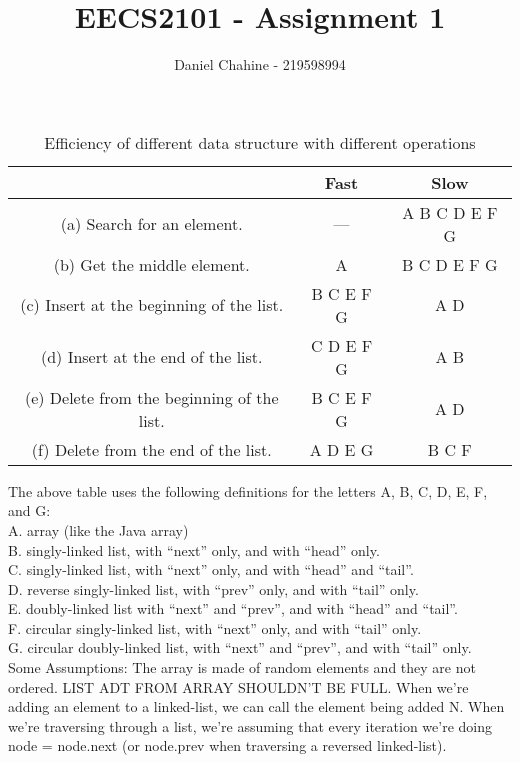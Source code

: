 \documentclass{article}
\title{EECS2101 - Assignment 1}
\author{Daniel Chahine - 219598994}
\begin{document}
\maketitle


\begin{table}[h!]
\setlength{\tabcolsep}{25pt}
\renewcommand{\arraystretch}{1.5}
\centering
\begin{tabular}{ ||c|c|c||  }
 \hline
  & \textbf{Fast} & \textbf{Slow}\\ 
 \hline
 (a) Search for an element. & --- & A B C D E F G   \\\hline 
 (b) Get the middle element. & A & B C D E F G  \\\hline
 (c) Insert at the beginning of the list. & B C E F G & A D\\\hline
 (d) Insert at the end of the list. & C D E F G  & A B \\\hline
 (e) Delete from the beginning of the list. & B C E F G & A D \\\hline 
 (f) Delete from the end of the list. & A D E G & B C F \\
 
 \hline
\end{tabular}
\caption{Efficiency of different data structure with different operations}
\label{table:1}
\end{table}

The above table uses the following definitions for the letters A, B, C, D, E, F, and G:\\
A. array (like the Java array)\\
B. singly-linked list, with “next” only, and with “head” only.\\
C. singly-linked list, with “next” only, and with “head” and “tail”.\\
D. reverse singly-linked list, with “prev” only, and with “tail” only.\\
E. doubly-linked list with “next” and “prev”, and with “head” and “tail”.\\
F. circular singly-linked list, with “next” only, and with “tail” only.\\
G. circular doubly-linked list, with “next” and “prev”, and with “tail” only.\\

Some Assumptions: The array is made of random elements and they are not ordered. LIST ADT FROM ARRAY SHOULDN'T BE FULL. When we're adding an element to a linked-list, we can call the element being added N. When we're traversing through a list, we're assuming that every iteration we're doing node = node.next (or node.prev when traversing a reversed linked-list). 
\end{document}
